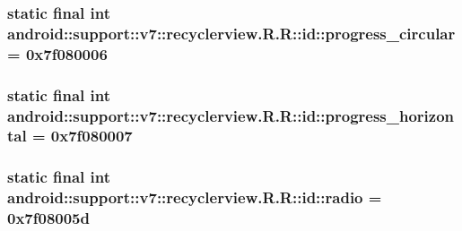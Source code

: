 \hypertarget{classandroid_1_1support_1_1v7_1_1recyclerview_1_1_r_1_1id_b259f1342abae2a305a56ad336c9e67d}{
\subsubsection[{progress\_\-circular}]{\setlength{\rightskip}{0pt plus 5cm}static final int android::support::v7::recyclerview.R.R::id::progress\_\-circular = 0x7f080006}}
\label{classandroid_1_1support_1_1v7_1_1recyclerview_1_1_r_1_1id_b259f1342abae2a305a56ad336c9e67d}


\hypertarget{classandroid_1_1support_1_1v7_1_1recyclerview_1_1_r_1_1id_e2c7b95988c45e8a66c08becfb56259c}{
\subsubsection[{progress\_\-horizontal}]{\setlength{\rightskip}{0pt plus 5cm}static final int android::support::v7::recyclerview.R.R::id::progress\_\-horizontal = 0x7f080007}}
\label{classandroid_1_1support_1_1v7_1_1recyclerview_1_1_r_1_1id_e2c7b95988c45e8a66c08becfb56259c}


\hypertarget{classandroid_1_1support_1_1v7_1_1recyclerview_1_1_r_1_1id_ff70d047362d52847841e5650b9966dc}{
\subsubsection[{radio}]{\setlength{\rightskip}{0pt plus 5cm}static final int android::support::v7::recyclerview.R.R::id::radio = 0x7f08005d}}
\label{classandroid_1_1support_1_1v7_1_1recyclerview_1_1_r_1_1id_ff70d047362d52847841e5650b9966dc}


